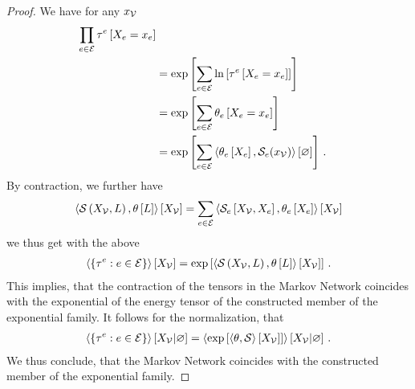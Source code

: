 \begin{proof}
    We have for any $x_{\mathcal{V}}$
    \begin{align*}
        \prod_{e\in\mathcal{E}} \tau^{e}\left[X_{e}=x_{e}\right] \\
        &= \mathrm{exp}\left[\sum_{e\in\mathcal{E}} \ln \left[ \tau^{e}\left[X_{e}=x_{e}\right] \right]\right] \\
        &= \mathrm{exp}\left[\sum_{e\in\mathcal{E}} \theta_{e}\left[X_{e}=x_{e}\right]\right] \\
        &= \mathrm{exp}\left[\sum_{e\in\mathcal{E}} \left\langle \theta_{e}\left[X_{e}\right],\mathcal{S}_{e}(x_{\mathcal{V}})\right\rangle \left[ \varnothing \right]\right]  \, .
    \end{align*}
    By contraction, we further have
    \begin{align*}
        \left\langle \mathcal{S}\left(X_{\mathcal{V}},L\right),\theta\left[L\right]\right\rangle \left[ X_{\mathcal{V}} \right]
        = \sum_{e\in\mathcal{E}} \left\langle \mathcal{S}_{e}\left[X_{\mathcal{V}},X_{e}\right],\theta_{e}\left[X_{e}\right]\right\rangle \left[ X_{\mathcal{V}} \right]
    \end{align*}
    we thus get with the above
    \begin{align}
        \left\langle \{\tau^{e}: e\in\mathcal{E}\}\right\rangle \left[ X_{\mathcal{V}} \right]
        = \mathrm{exp}\left[\left\langle \mathcal{S}\left(X_{\mathcal{V}},L\right),\theta\left[L\right]\right\rangle \left[ X_{\mathcal{V}} \right]\right] \, .
    \end{align}
    This implies, that the contraction of the tensors in the Markov Network coincides with the exponential of the energy tensor of the constructed member of the exponential family.
    It follows for the normalization, that
    \begin{align}
        \left\langle \{\tau^{e}: e\in\mathcal{E}\}\right\rangle \left[ X_{\mathcal{V}} | \varnothing \right]
        = \left\langle \mathrm{exp}\left[\left\langle \theta,\mathcal{S}\right\rangle \left[ X_{\mathcal{V}} \right]\right]\right\rangle \left[ X_{\mathcal{V}} | \varnothing \right] \, .
    \end{align}
    We thus conclude, that the Markov Network coincides with the constructed member of the exponential family.
\end{proof}

